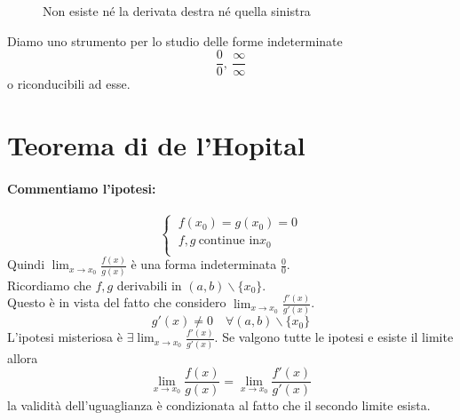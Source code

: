 \documentclass[twoside]{report}
\begin{document}
\begin{figure}[]
    \centering
    \caption{Non esiste né la derivata destra né quella sinistra}
    \label{}
\end{figure}

Diamo uno strumento per lo studio delle forme indeterminate \[
\frac{0}{0}, \ \frac{\infty}{\infty}
\] 
o riconducibili ad esse.

\section{Teorema di de l'Hopital}
\paragraph{Commentiamo l'ipotesi:}
\[
\begin{cases}
    \ f(x_0) = g(x_0) = 0 \\
    \ f, g \ \text{continue in} x_0 \\
\end{cases}
\] 
Quindi \(\lim_{x \to x_0} \frac{f(x)}{g(x)}\) è una forma indeterminata \(\frac{0}{0}\). \\ Ricordiamo che \(f,g\) derivabili in \((a,b) \backslash \{x_0\} \). \\ Questo è in vista del fatto che considero \(\lim_{x \to x_0} \frac{f'(x)}{g'(x)}\).  \[
g'(x) \neq  0 \quad \forall (a,b) \backslash \{x_0\} 
\] 
L'ipotesi misteriosa è \(\exists \lim_{x \to x_0} \frac{f'(x)}{g'(x)}\). Se valgono tutte le ipotesi e esiste il limite allora  \[
\lim_{x \to x_0} \frac{f(x)}{g(x)}= \lim_{x \to x_0} \frac{f'(x)}{g'(x)}
\] la validità dell'uguaglianza è condizionata al fatto che il secondo limite esista.
\end{document}
